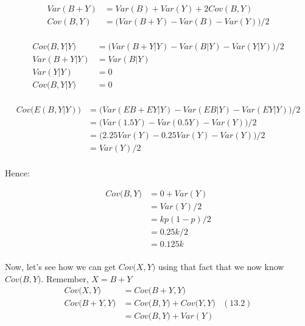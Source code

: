 \documentclass[letter]{article}
\begin{document}
\begin{equation*}
	\begin{aligned}
	Var(B + Y) &= Var(B) + Var(Y) + 2Cov(B,Y) \\
	Cov(B,Y) &= \big(Var(B + Y) - Var(B) - Var(Y)\big)/2 \\
	\end{aligned}
\end{equation*}

\begin{equation*}
	\begin{aligned}
	Cov\big(B,Y|Y\big) &= \big(Var(B + Y|Y) - Var(B|Y) - Var(Y|Y)\big)/2 \\
	Var(B + Y|Y) &= Var(B|Y)\\
	Var(Y|Y)&=0 \\
	Cov\big(B,Y|Y\big) &= 0 \\
	\end{aligned}
\end{equation*}

\begin{equation*}
	\begin{aligned}
	Cov\big(E(B,Y|Y)\big) &= \big(Var(EB + EY|Y) - Var(EB|Y) - Var(EY|Y)\big)/2 \\
	        &= \big(Var(1.5Y) - Var(0.5Y) - Var(Y)\big)/2 \\
	        &= \big(2.25Var(Y) - 0.25Var(Y) - Var(Y)\big)/2 \\
	        &= Var(Y)/2 \\
	\end{aligned}
\end{equation*}

Hence:

\begin{equation*}
	\begin{aligned}
	Cov\big(B,Y\big) &= 0 + Var(Y)\\
	&= Var(Y)/2\\
	&= kp(1-p)/2\\
	&= 0.25k/2\\
	&= 0.125k\\
	\end{aligned}
\end{equation*}

Now, let's see how we can get $Cov\big(X,Y\big)$ using that fact that we now know $Cov\big(B,Y\big)$. Remember, $X=B+Y$
\begin{equation*}
	\begin{aligned}
	Cov\big(X,Y\big) &= Cov\big(B+Y,Y\big)\\
	Cov\big(B+Y,Y\big) &= Cov\big(B,Y\big) + Cov\big(Y,Y\big)&(\textrm{13.2})\\
	&= Cov\big(B,Y\big) + Var(Y)\\
	\end{aligned}
\end{equation*}
\end{document}
